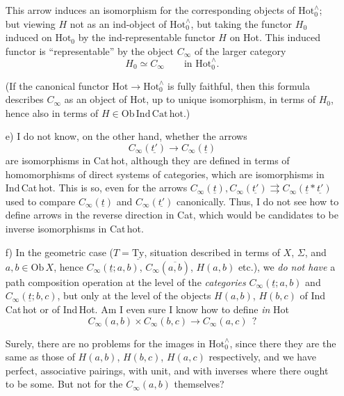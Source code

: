 \documentclass[11pt]{article}
\newcommand{\printedpage}[1]{\marginpar{\footnotesize p.~#1}}
\newcommand{\msp}[1]{\marginpar{\footnotesize [#1]}}
\newcommand{\Hot}{\mathrm{Hot}}
\newcommand{\Hotz}{\mathrm{Hot}_0^{\wedge}}
\begin{document}
\begin{enumerate}
This arrow induces an isomorphism for the corresponding objects of $\Hotz$; but viewing $H$ not as an ind-object of $\Hotz$, but taking the functor $H_0$ induced on $\Hot_0$ by the ind-representable functor $H$ on Hot. This induced functor is ``representable'' by the object $C_\infty$ of the larger category
\[
H_0 \simeq C_\infty \qquad \text{in } \Hotz.
\]

(If the canonical functor $\Hot \longrightarrow \Hotz$ is fully faithful, then this formula describes $C_\infty$ as an object of Hot, up to unique isomorphism, in terms of $H_0$, hence also in terms of $H \in \mathrm{Ob\,Ind\,Cat\,hot}$.)

\printedpage{78}
\msp{page 124}
\item[e)] I do not know, on the other hand, whether the arrows
\[
C_\infty(\underline{t'}) \longrightarrow C_\infty(\underline{t})
\]
are isomorphisms in Cat\,hot, although they are defined in terms of homomorphisms of direct systems of categories, which are isomorphisms in Ind\,Cat\,hot. This is so, even for the arrows $C_\infty(\underline{t}), C_\infty(\underline{t'}) \rightrightarrows C_\infty(\underline{t} * \underline{t'})$ used to compare $C_\infty(\underline{t})$ and $C_\infty(\underline{t'})$ canonically. Thus, I do not see how to define arrows in the reverse direction in Cat, which would be candidates to be inverse isomorphisms in Cat\,hot.

\item[f)] In the geometric case ($T = \underline{\mathrm{Ty}}$, situation described in terms of $X$, $\Sigma$, and $a, b \in \mathrm{Ob}\,X$, hence $C_\infty(\underline{t}; a, b)$, $C_\infty(\overline{a, b})$, $H(a,b)$ etc.), we \textit{do not have} a path composition operation at the level of the \textit{categories} $C_\infty(\underline{t}; a, b)$ and $C_\infty(\underline{t}; b, c)$, but only at the level of the objects $H(a,b)$, $H(b,c)$ of Ind\,Cat\,hot or of Ind\,Hot. Am I even sure I know how to define \textit{in} Hot
\[
C_\infty(a,b) \times C_\infty(b,c) \longrightarrow C_\infty(a,c) \ \ ?
\]

Surely, there are no problems for the images in $\Hotz$, since there they are the same as those of $H(a,b)$, $H(b,c)$, $H(a,c)$ respectively, and we have perfect, associative pairings, with unit, and with inverses where there ought to %
\msp{page 125}
be some. But not for the $C_\infty(a,b)$ themselves?
\end{enumerate}
\end{document}

